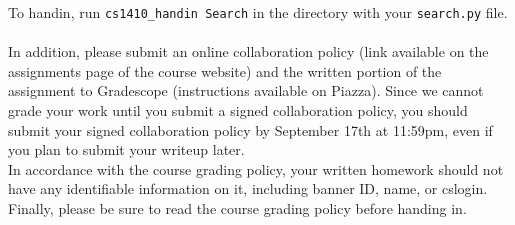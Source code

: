 \documentclass{article}
\begin{document}
To handin, run \verb|cs1410_handin Search| in the directory with your \verb|search.py| file. ~\\

In addition, please submit an online collaboration policy (link available on the assignments page of the course website)
and the written portion of the assignment to Gradescope (instructions available on Piazza).
Since we cannot grade your work until you submit a signed collaboration
policy, you should submit your signed collaboration policy by September 17th at
11:59pm, even if you plan to submit your writeup later. ~\\

In accordance with the course grading policy, your written homework should
not have any identifiable information on it, including banner ID, name, or cslogin. ~\\

Finally, please be sure to read the course grading policy before handing in.
\end{document}
